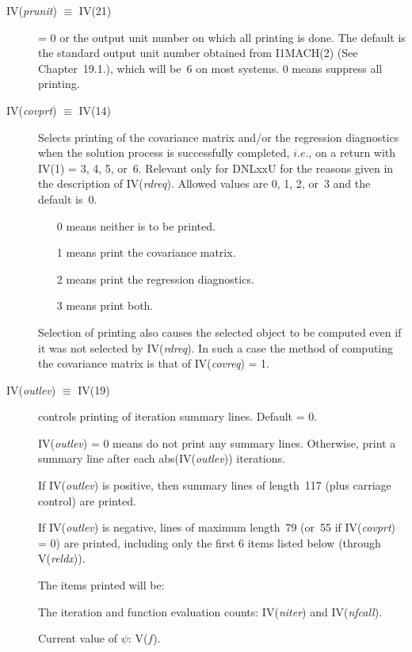 \documentclass[twoside]{MATH77}
\begin{document}
\begin{description}
\item[IV({\em prunit}) $\equiv $ IV(21)]  = 0 or the output unit number on which
all printing is done. The default is the standard output unit number
obtained from I1MACH(2) (See Chapter~19.1.), which will be~6 on most systems.
0 means suppress all printing.

\item[IV({\em covprt}) $\equiv $ IV(14)]  Selects printing of the covariance matrix
and/or the regression diagnostics when the solution process is successfully
completed, $i.e.$, on a return with IV(1) = 3, 4, 5, or~6.  Relevant
only for DNLxxU for the reasons given in the description of
IV({\em rdreq}).  Allowed values are 0, 1, 2, or~3 and the default is~0.
\begin{itemize}
\item[0]  means neither is to be printed.

\item[1]  means print the covariance matrix.

\item[2]  means print the regression diagnostics.

\item[3]  means print both.
\end{itemize}
Selection of printing also causes the selected object to be computed even if
it was not selected by IV({\em rdreq}). In such a case the method of computing the
covariance matrix is that of IV({\em covreq}) = 1.

\item[IV({\em outlev}) $\equiv $ IV(19)]  controls printing of iteration summary
lines. Default = 0.

IV({\em outlev}) = 0 means do not print any summary lines. Otherwise, print a
summary line after each abs(IV({\em outlev})) iterations.

If IV({\em outlev}) is positive, then summary lines of length~117 (plus carriage
control) are printed.

If IV({\em outlev}) is negative, lines of maximum length~79 (or~55 if IV({\em covprt}) =
0) are printed, including only the first 6 items listed below (through
V({\em reldx})).

The items printed will be:

The iteration and function evaluation counts: IV({\em niter}) and IV({\em nfcall}).

Current value of $\psi $: V($f$).


\end{description}
\end{document}
